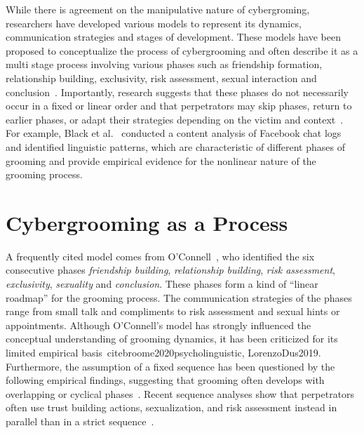 While there is agreement on the manipulative nature of cybergroming, researchers have developed various models to represent its dynamics, communication strategies and stages of development\parencite{kloess2014online}. These models have been proposed to conceptualize the process of cybergrooming and often describe it as a multi stage process involving various phases such as friendship formation, relationship building, exclusivity, risk assessment, sexual interaction and conclusion~\cite{oconnell2003typology,whittle2013review,kloess2014online,chiangandgrant2017online}. Importantly, research suggests that these phases do not necessarily occur in a fixed or linear order and that perpetrators may skip phases, return to earlier phases, or adapt their strategies depending on the victim and context~\cite{whittle2013review,chiangandgrant2017online,Joleby2021offender}. For example, Black et al.~\cite{black2015linguistic} conducted a content analysis of Facebook chat logs and identified linguistic patterns, which are characteristic of different phases of grooming and provide empirical evidence for the nonlinear nature of the grooming process.

\section{Cybergrooming as a Process}

A frequently cited model comes from O’Connell~\cite{oconnell2003typology}, who identified the six consecutive phases \emph{friendship building}, \emph{relationship building}, \emph{risk assessment}, \emph{exclusivity}, \emph{sexuality} and \emph{conclusion}. These phases form a kind of “linear roadmap” for the grooming process. The communication strategies of the phases range from small talk and compliments to risk assessment and sexual hints or appointments. Although O'Connell's model has strongly influenced the conceptual understanding of grooming dynamics, it has been criticized for its limited empirical basis~cite{broome2020psycholinguistic, LorenzoDus2019}. Furthermore, the assumption of a fixed sequence has been questioned by the following empirical findings, suggesting that grooming often develops with overlapping or cyclical phases~\cite{Joleby2021offender}. Recent sequence analyses show that perpetrators often use trust building actions, sexualization, and risk assessment instead in parallel than in a strict sequence~\cite{Ringenberg2024assessing}.

